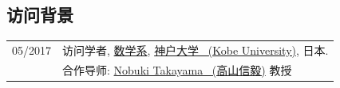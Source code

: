 \documentclass[a4paper,12pt]{article}
\begin{document}
\begin{CJK*}{UTF8}{gbsn}
\section*{\Large{访问背景}}
\begin{tabular}{@{}p{1.0in}p{4.5in}}
05/2017               & 访问学者, 
                        \href{http://www.math.kobe-u.ac.jp/}{数学系},
                        \href{http://www.kobe-u.ac.jp/en/}{神户大学 \ (Kobe University)}, 日本. \\                       
                        & 合作导师: \href{http://www.math.kobe-u.ac.jp/home-j/takayama-e.html}{Nobuki Takayama \ (高山信毅)} 教授\\
\end{tabular}





\end{CJK*}
\end{document}
